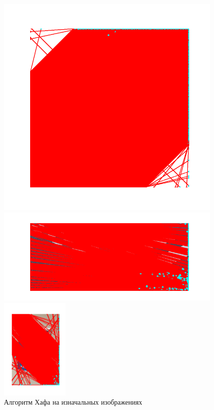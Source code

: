 \documentclass[a4paper,12pt]{article}
\begin{document}
\begin{figure}[H]
    \centering
    \begin{minipage}{0.48\textwidth}
        \centering
        \includegraphics[width=\textwidth]{images/hough_lines/1_orig_hough_lines.png}
    \end{minipage}
    \begin{minipage}{0.48\textwidth}
        \centering
        \includegraphics[width=\textwidth]{images/hough_lines/2_orig_hough_lines.png}
    \end{minipage}
    \includegraphics[width=0.3\textwidth]{images/hough_lines/3_orig_hough_lines.png}
    \caption{Алгоритм Хафа на изначальных изображениях}
\end{figure}
\end{document}
